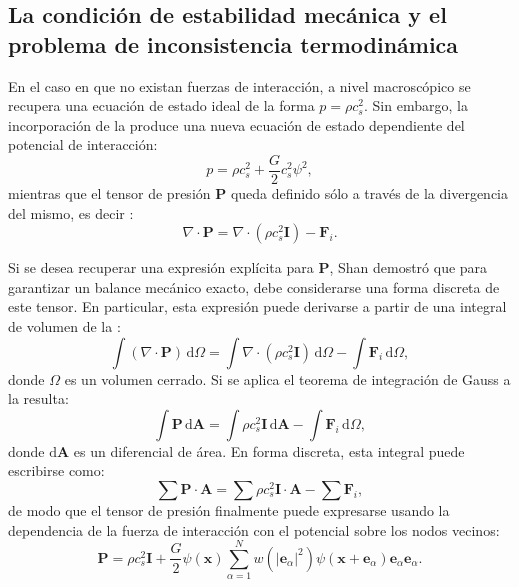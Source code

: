 \subsection{La condici\'on de estabilidad mec\'anica y el problema de inconsistencia termodin\'amica}

En el caso en que no existan fuerzas de interacci\'on, a nivel macrosc\'opico se recupera una ecuaci\'on de estado ideal de la forma $p=\rho c_s^2$. Sin embargo, la incorporaci\'on de la  produce una nueva ecuaci\'on de estado dependiente del potencial de interacci\'on:
\begin{equation}
	p = \rho c_s^2 + \dfrac{G}{2} c_s^2 \psi ^2,
\end{equation}
mientras que el tensor de presi\'on $\bm{P}$ queda definido s\'olo a trav\'es de la divergencia del mismo, es decir \cite{he_thermodynamic_2002}:
\begin{equation}
	\nabla \cdot \bm{P} = \nabla \cdot (\rho c_s^2 \bm{I}) - \bm{F}_i.
	\label{eq:ptens}
\end{equation}

Si se desea recuperar una expresi\'on expl\'icita para $\bm{P}$, Shan \cite{shan_pressure_2008} demostr\'o que para garantizar un balance mec\'anico exacto, debe considerarse una forma discreta de este tensor. En particular, esta expresi\'on puede derivarse a partir de una integral de volumen de la :
\begin{equation}
	\int (\nabla \cdot \bm{P}) \, \mbox{d}\Omega = \int \nabla \cdot (\rho c_s^2 \bm{I})\, \mbox{d}\Omega - \int \bm{F}_i \, \mbox{d}\Omega,
	\label{eq:integral_pres}
\end{equation}
donde $\Omega$ es un volumen cerrado. Si se aplica el teorema de integraci\'on de Gauss a la  resulta:
\begin{equation}
	\int \bm{P} \, \mbox{d} \bm{A} = \int \rho c_s^2 \bm{I}\, \mbox{d} \bm{A} - \int \bm{F}_i \, \mbox{d}\Omega,
\end{equation}
donde $\mbox{d} \bm{A}$ es un diferencial de \'area. En forma discreta, esta integral puede escribirse como:
\begin{equation}
	\sum \bm{P} \cdot \bm{A} = \sum \rho c_s^2 \bm{I} \cdot \bm{A} - \sum \bm{F}_i,
\end{equation}
de modo que el tensor de presi\'on finalmente puede expresarse usando la dependencia de la fuerza de interacci\'on con el potencial sobre los nodos vecinos:
\begin{equation}
	\bm{P} = \rho c_s^2 \bm{I} + \dfrac{G}{2}\psi(\bm{x}) \sum_{\alpha=1}^N w(|\bm{e}_{\alpha}|^2)\psi(\bm{x}+\bm{e}_{\alpha})\bm{e}_{\alpha}\bm{e}_{\alpha}.
	\label{eq:ptens_shan}
\end{equation}

